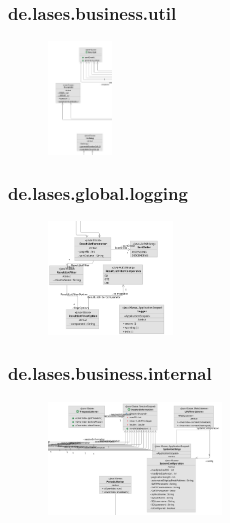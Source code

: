 \subsubsection{de.lases.business.util}

\begin{figure}[H]
	\centering
	\includegraphics[height=3cm]{graphics/business_util}
\end{figure}


\subsubsection{de.lases.global.logging}

\begin{figure}[H]
	\centering
	\includegraphics[height=3cm]{graphics/global_util}
\end{figure}


\subsubsection{de.lases.business.internal}

\begin{figure}[H]
	\centering
	\includegraphics[height=3cm]{graphics/business_internal}
\end{figure}


